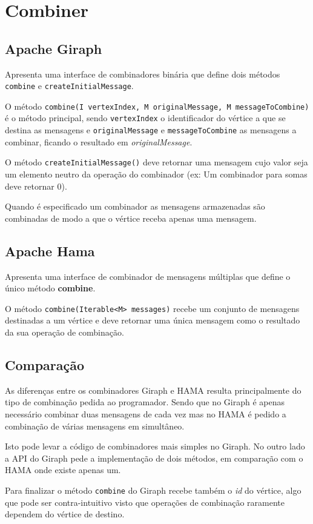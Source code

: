 \newpage
\section*{Combiner}

\subsection*{Apache Giraph}
Apresenta uma interface de combinadores binária que define dois métodos \texttt{combine} e \texttt{createInitialMessage}.

O método \texttt{combine(I vertexIndex, M originalMessage, M messageToCombine)} é o método principal, sendo \texttt{vertexIndex} o identificador do vértice a que se destina as mensagens e \texttt{originalMessage} e \texttt{messageToCombine} as mensagens a combinar, ficando o resultado em \textsl{originalMessage}.

O método \texttt{createInitialMessage()} deve retornar uma mensagem cujo valor seja um elemento neutro da operação do combinador (ex: Um combinador para somas deve retornar 0).

Quando é especificado um combinador as mensagens armazenadas são combinadas de modo a que o vértice receba apenas uma mensagem.


\subsection*{Apache Hama}
Apresenta uma interface de combinador de mensagens múltiplas que define o único método \textbf{combine}.

O método \texttt{combine(Iterable<M> messages)} recebe um conjunto de mensagens destinadas a um vértice e deve retornar uma única mensagem como o resultado da sua operação de combinação.


\subsection*{Comparação}
As diferenças entre os combinadores Giraph e HAMA resulta principalmente do tipo de combinação pedida ao programador. Sendo que no Giraph é apenas necessário combinar duas mensagens de cada vez mas no HAMA é pedido a combinação de várias mensagens em simultâneo.

Isto pode levar a código de combinadores mais simples no Giraph. No outro lado a API do Giraph pede a implementação de dois métodos, em comparação com o HAMA onde existe apenas um.

Para finalizar o método \texttt{combine} do Giraph recebe também o \textit{id} do vértice, algo que pode ser contra-intuitivo visto que operações de combinação raramente dependem do vértice de destino.
